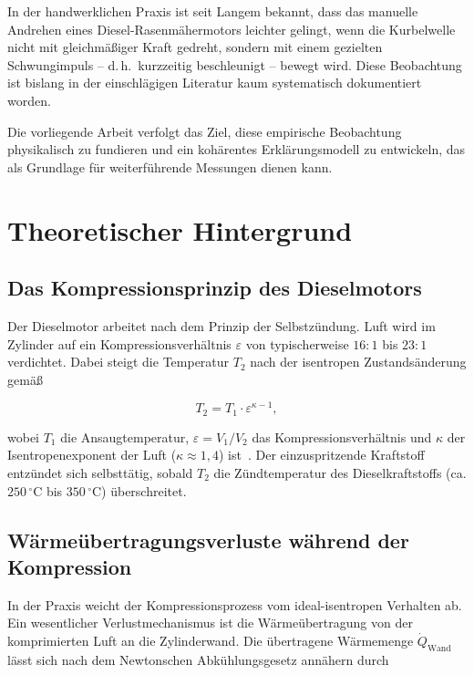 ﻿\documentclass[a4paper,12pt]{article}
\begin{document}
In der handwerklichen Praxis ist seit Langem bekannt, dass das manuelle Andrehen
eines Diesel-Rasenmähermotors leichter gelingt, wenn die Kurbelwelle nicht mit
gleichmäßiger Kraft gedreht, sondern mit einem gezielten Schwungimpuls -- d.\,h.\
kurzzeitig beschleunigt -- bewegt wird. Diese Beobachtung ist bislang in der
einschlägigen Literatur kaum systematisch dokumentiert worden.

Die vorliegende Arbeit verfolgt das Ziel, diese empirische Beobachtung physikalisch
zu fundieren und ein kohärentes Erklärungsmodell zu entwickeln, das als Grundlage
für weiterführende Messungen dienen kann.

\section{Theoretischer Hintergrund}

\subsection{Das Kompressionsprinzip des Dieselmotors}

Der Dieselmotor arbeitet nach dem Prinzip der Selbstzündung. Luft wird im Zylinder
auf ein Kompressionsverhältnis $\varepsilon$ von typischerweise $16 {:} 1$ bis
$23 {:} 1$ verdichtet. Dabei steigt die Temperatur $T_2$ nach der isentropen
Zustandsänderung gemäß

\begin{equation}
  T_2 = T_1 \cdot \varepsilon^{\kappa - 1},
  \label{eq:isentrop}
\end{equation}

\noindent
wobei $T_1$ die Ansaugtemperatur, $\varepsilon = V_1 / V_2$ das Kompressionsverhältnis
und $\kappa$ der Isentropenexponent der Luft ($\kappa \approx 1{,}4$) ist~\cite{heywood1988}.
Der einzuspritzende Kraftstoff entzündet sich selbsttätig, sobald $T_2$ die Zündtemperatur
des Dieselkraftstoffs (ca. $250\,^\circ\text{C}$ bis $350\,^\circ\text{C}$) überschreitet.

\subsection{Wärmeübertragungsverluste während der Kompression}

In der Praxis weicht der Kompressionsprozess vom ideal-isentropen Verhalten ab.
Ein wesentlicher Verlustmechanismus ist die Wärmeübertragung von der komprimierten
Luft an die Zylinderwand. Die übertragene Wärmemenge $\dot{Q}_\text{Wand}$
lässt sich nach dem Newtonschen Abkühlungsgesetz annähern durch
\end{document}
